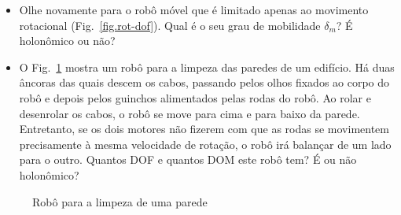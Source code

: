 \begin{framed}
\begin{itemize}
\item Olhe novamente para o robô móvel que é limitado apenas ao movimento rotacional (Fig.~\ref{fig.rot-dof}). Qual é o seu grau de mobilidade $\delta_m$? É holonômico ou não?
\item O Fig.~\ref{fig.wallcleaning} mostra um robô para a limpeza das paredes de um edifício. Há duas âncoras das quais descem os cabos, passando pelos olhos fixados ao corpo do robô e depois pelos guinchos alimentados pelas rodas do robô. Ao rolar e desenrolar os cabos, o robô se move para cima e para baixo da parede. Entretanto, se os dois motores não fizerem com que as rodas se movimentem precisamente à mesma velocidade de rotação, o robô irá balançar de um lado para o outro. Quantos DOF e quantos DOM este robô tem? É ou não holonômico?
\end{itemize}
\end{framed}


\begin{figure}
\begin{center}
\end{center}
\caption{Robô para a limpeza de uma parede}\label{fig.wallcleaning}
\end{figure}


